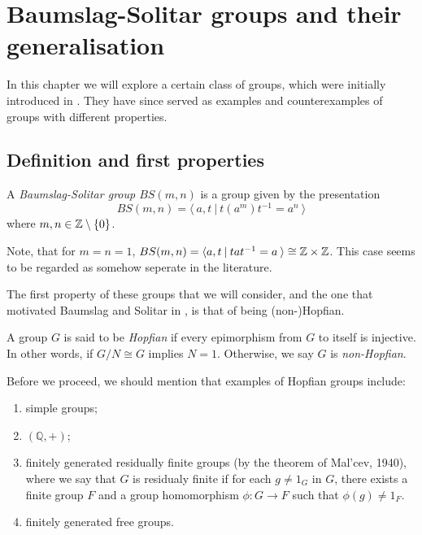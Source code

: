 \pagebreak %

\section{Baumslag-Solitar groups and their generalisation}
\label{BSGroups} %

In this chapter we will explore a certain class of groups, which were initially introduced in \cite{BaSo62}. They have since served as examples and counterexamples of groups with different properties.

\subsection{Definition and first properties}

\begin{definition}
    A \emph{Baumslag-Solitar group $BS(m,n)$} is a group given by the presentation \[BS(m,n) = \langle \: a, t\:|\:t(a^m)t^{-1} = a^n \: \rangle \] where $m,n \in \mathbb{Z} \setminus \{0\}$.
\end{definition}

\begin{remark}
    Note, that for $m = n = 1$, $BS(m,n) = \langle a,t \: | \: tat^{-1} = a \: \rangle \cong \mathbb{Z} \times \mathbb{Z}$. This case seems to be regarded as somehow seperate in the literature.
\end{remark}

The first property of these groups that we will consider, and the one that motivated Baumslag and Solitar in \cite{BaSo62}, is that of being (non-)Hopfian.

\begin{definition}
    A group $G$ is said to be \emph{Hopfian} if every epimorphism from $G$ to itself is injective. In other words, if $G/N \cong G$ implies $N = 1$. Otherwise, we say $G$ is \emph{non-Hopfian}.
\end{definition}
    
Before we proceed, we should mention that examples of Hopfian groups include:
\begin{enumerate}
    \item simple groups;
    \item $(\mathbb{Q},+)$;
    \item finitely generated residually finite groups (by the theorem of Mal'cev, 1940), where we say that $G$ is residualy finite if for each $g \neq 1_G$ in $G$, there exists a finite group $F$ and a group homomorphism $\phi: G \to F$ such that $\phi(g) \neq 1_F$.
    \item finitely generated free groups.
\end{enumerate}

